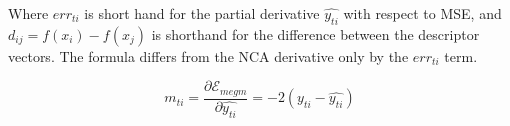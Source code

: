 Where $ err_{ti} $ is short hand for the partial derivative $ \hat{y_{ti}} $ with respect to \gls{MSE}, and $ d_{ij} = f(x_i) - f(x_j) $ is shorthand for the difference between the descriptor vectors. The formula differs from the \gls{NCA} derivative only by the $ err_{ti} $ term.

\begin{equation}
m_{ti} = \frac{\partial \mathcal{E}_{megm}}{\partial \hat{y_{ti}}} = -2 (y_{ti} - \hat{y_{ti}})
\label{eq:megm_partial}
\end{equation}

